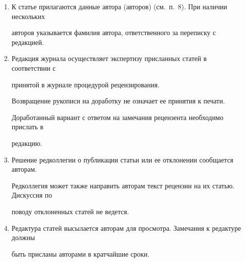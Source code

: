 {\begin{enumerate}[1.]
Редколлегия вправе запросить у авторов экспертное заключение о возможности


пуб\-ли\-ка\-ции пред\-став\-лен\-ной статьи в открытой печати.\\[-13.5pt]





\item К статье прилагаются данные автора (авторов) (см.\ п.~8). При наличии нескольких


авторов указывается фамилия автора, ответственного за переписку с редакцией.\\[-13.5pt]





\item Редакция журнала осуществляет экспертизу присланных статей в соответствии с


принятой в журнале процедурой рецензирования.





Возвращение рукописи на доработку не означает ее принятия к печати.





Доработанный вариант с ответом на замечания рецензента необходимо прислать в


редакцию.\\[-13.5pt]





\item Решение редколлегии о публикации статьи или ее отклонении сообщается авторам.





Редколлегия может также направить авторам текст рецензии на их статью. Дискуссия по


поводу отклоненных статей не ведется.\\[-13.5pt]










\item Редактура статей высылается авторам для просмотра. Замечания к редактуре должны


быть присланы авторами в кратчайшие сроки.\\[-13.5pt]






\end{enumerate}}
